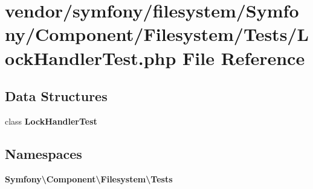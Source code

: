 \section{vendor/symfony/filesystem/\+Symfony/\+Component/\+Filesystem/\+Tests/\+Lock\+Handler\+Test.php File Reference}
\label{_lock_handler_test_8php}
\subsection*{Data Structures}
\begin{DoxyCompactItemize}
\item 
class {\bf Lock\+Handler\+Test}
\end{DoxyCompactItemize}
\subsection*{Namespaces}
\begin{DoxyCompactItemize}
\item 
 {\bf Symfony\textbackslash{}\+Component\textbackslash{}\+Filesystem\textbackslash{}\+Tests}
\end{DoxyCompactItemize}
